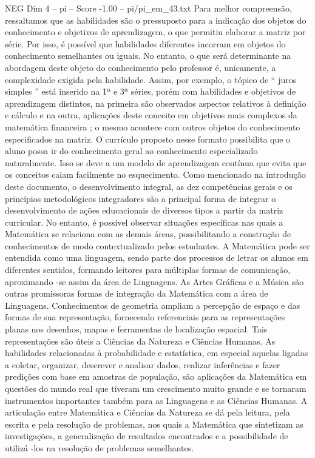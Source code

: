\begin{textsample}{NEG Dim 4 – pi – Score -1.00 – pi/pi\_em\_43.txt}
Para melhor compreensão, ressaltamos que as habilidades são o pressuposto para a indicação dos objetos do conhecimento e objetivos de aprendizagem, o que permitiu elaborar a matriz por série.
Por isso, é possível que habilidades diferentes incorram em objetos do conhecimento semelhantes ou iguais.
No entanto, o que será determinante na abordagem deste objeto do conhecimento pelo professor é, unicamente, a complexidade exigida pela habilidade.
Assim, por exemplo, o tópico de “ juros simples ” está inserido na 1ª e 3ª séries, porém com habilidades e objetivos de aprendizagem distintos, na primeira são observados aspectos relativos à definição e cálculo e na outra, aplicações deste conceito em objetivos mais complexos da matemática financeira ; o mesmo acontece com outros objetos do conhecimento especificados na matriz.
O currículo proposto nesse formato possibilita que o aluno possa ir do conhecimento geral ao conhecimento especializado naturalmente.
Isso se deve a um modelo de aprendizagem contínua que evita que os conceitos caiam facilmente no esquecimento.
Como mencionado na introdução deste documento, o desenvolvimento integral, as dez competências gerais e os princípios metodológicos integradores são a principal forma de integrar o desenvolvimento de ações educacionais de diversos tipos a partir da matriz curricular.
No entanto, é possível observar situações específicas nas quais a Matemática se relaciona com as demais áreas, possibilitando a construção de conhecimentos de modo contextualizado pelos estudantes.
A Matemática pode ser entendida como uma linguagem, sendo parte dos processos de letrar os alunos em diferentes sentidos, formando leitores para múltiplas formas de comunicação, aproximando -se assim da área de Linguagens.
As Artes Gráficas e a Música são outras promissoras formas de integração da Matemática com a área de Linguagens.
Conhecimentos de geometria ampliam a percepção de espaço e das formas de sua representação, fornecendo referenciais para as representações planas nos desenhos, mapas e ferramentas de localização espacial.
Tais representações são úteis a Ciências da Natureza e Ciências Humanas.
As habilidades relacionadas à probabilidade e estatística, em especial aquelas ligadas a coletar, organizar, descrever e analisar dados, realizar inferências e fazer predições com base em amostras de população, são aplicações da Matemática em questões do mundo real que tiveram um crescimento muito grande e se tornaram instrumentos importantes também para as Linguagens e as Ciências Humanas.
A articulação entre Matemática e Ciências da Natureza se dá pela leitura, pela escrita e pela resolução de problemas, nos quais a Matemática que sintetizam as investigações, a generalização de resultados encontrados e a possibilidade de utilizá -los na resolução de problemas semelhantes.

\end{textsample}
